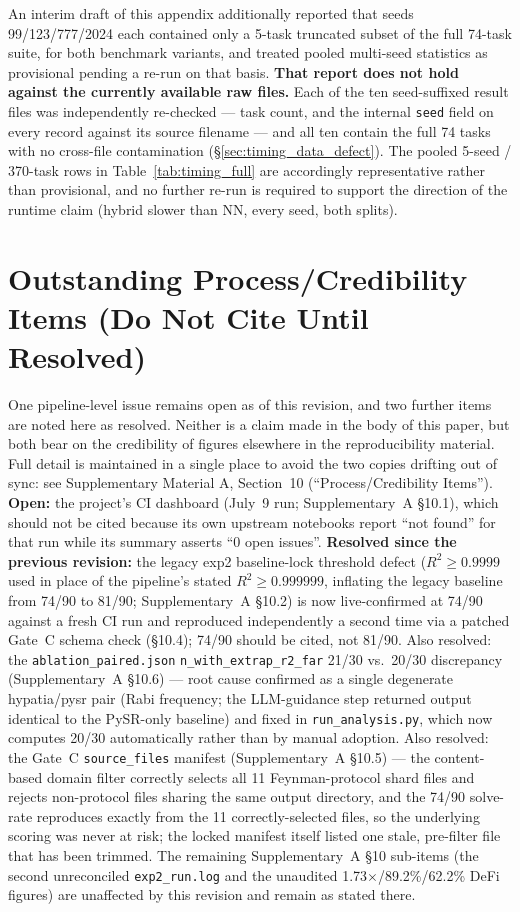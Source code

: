 \documentclass[twoside,11pt]{article}
\begin{document}
An interim draft of this appendix additionally reported that seeds
99/123/777/2024 each contained only a 5-task truncated subset of the full
74-task suite, for both benchmark variants, and treated pooled multi-seed
statistics as provisional pending a re-run on that basis. \textbf{That
report does not hold against the currently available raw files.} Each of
the ten seed-suffixed result files was independently re-checked --- task
count, and the internal \texttt{seed} field on every record against its
source filename --- and all ten contain the full 74 tasks with no
cross-file contamination (\S\ref{sec:timing_data_defect}). The pooled
5-seed / 370-task rows in Table~\ref{tab:timing_full} are accordingly
representative rather than provisional, and no further re-run is required
to support the direction of the runtime claim (hybrid slower than NN,
every seed, both splits).

\section{Outstanding Process/Credibility Items (Do Not Cite Until Resolved)}\label{sec:process_items}

One pipeline-level issue remains open as of this revision, and two further
items are noted here as resolved. Neither is a claim made in the body of this
paper, but both bear on the credibility of figures elsewhere in the
reproducibility material. Full detail is maintained in a single place to
avoid the two copies drifting out of sync: see Supplementary Material A,
Section~10 (``Process/Credibility Items''). \textbf{Open:} the project's CI
dashboard (July~9 run; Supplementary~A \S10.1), which should not be cited
because its own upstream notebooks report ``not found'' for that run while
its summary asserts ``0 open issues''. \textbf{Resolved since the previous
revision:} the legacy exp2 baseline-lock threshold defect ($R^2 \geq 0.9999$
used in place of the pipeline's stated $R^2 \geq 0.999999$, inflating the
legacy baseline from 74/90 to 81/90; Supplementary~A \S10.2) is now
live-confirmed at 74/90 against a fresh CI run and reproduced independently
a second time via a patched Gate~C schema check (\S10.4); 74/90 should be
cited, not 81/90. Also resolved: the \texttt{ablation\_paired.json}
\texttt{n\_with\_extrap\_r2\_far} 21/30 vs.\ 20/30 discrepancy
(Supplementary~A \S10.6) --- root cause confirmed as a single degenerate
hypatia/pysr pair (Rabi frequency; the LLM-guidance step returned output
identical to the PySR-only baseline) and fixed in
\texttt{run\_analysis.py}, which now computes 20/30 automatically rather
than by manual adoption. Also resolved: the Gate~C \texttt{source\_files}
manifest (Supplementary~A \S10.5) --- the content-based domain filter
correctly selects all 11 Feynman-protocol shard files and rejects
non-protocol files sharing the same output directory, and the 74/90
solve-rate reproduces exactly from the 11 correctly-selected files, so the
underlying scoring was never at risk; the locked manifest itself listed
one stale, pre-filter file that has been trimmed. The remaining
Supplementary~A \S10 sub-items (the second unreconciled
\texttt{exp2\_run.log} and the unaudited 1.73$\times$/89.2\%/62.2\% DeFi
figures) are unaffected by this revision and remain as stated there.
\end{document}
